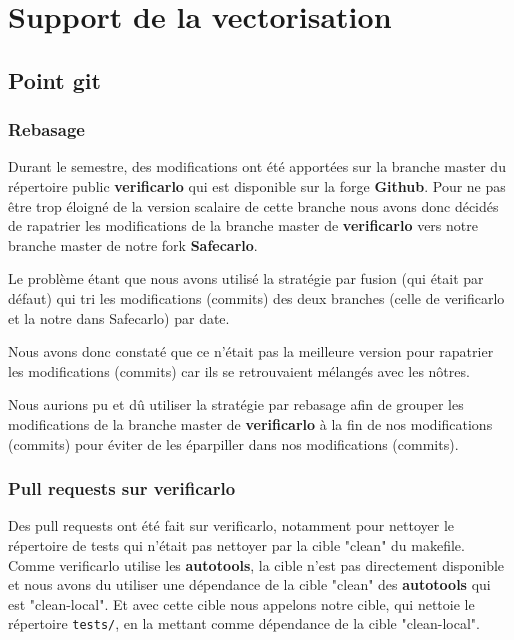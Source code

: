 \documentclass[11pt, letterpaper]{article}
\begin{document}
\section{Support de la vectorisation}
\label{sec:orgb80a6ba}
\subsection{Point git}
\label{sec:org9858b01}
\subsubsection{Rebasage}
\label{sec:org6aae736}

Durant le semestre, des modifications ont été apportées sur la branche master
du répertoire public \textbf{verificarlo} qui est disponible sur la forge
\textbf{Github}. Pour ne pas être trop éloigné de la version scalaire de
cette branche nous avons donc décidés de rapatrier les modifications de la
branche master de \textbf{verificarlo} vers notre branche master de notre fork
\textbf{Safecarlo}.

Le problème étant que nous avons utilisé la stratégie par fusion (qui était
par défaut) qui tri les modifications (commits) des deux branches (celle
de verificarlo et la notre dans Safecarlo) par date.

Nous avons donc constaté que ce n'était pas la meilleure version pour
rapatrier les modifications (commits) car ils se retrouvaient mélangés avec
les nôtres.

Nous aurions pu et dû utiliser la stratégie par rebasage afin de grouper les
modifications de la branche master de \textbf{verificarlo} à la fin de nos
modifications (commits) pour éviter de les éparpiller dans nos modifications
(commits).

\subsubsection{Pull requests sur verificarlo}
\label{sec:org3caeb5a}

Des pull requests ont été fait sur verificarlo, notamment pour nettoyer le
répertoire de tests qui n'était pas nettoyer par la cible "clean" du
makefile. Comme verificarlo utilise les \textbf{autotools}, la cible n'est pas
directement disponible et nous avons du utiliser une dépendance de la cible
"clean" des \textbf{autotools} qui est "clean-local". Et avec cette cible nous
appelons notre cible, qui nettoie le répertoire \texttt{tests/}, en la mettant
comme dépendance de la cible "clean-local".
\end{document}
